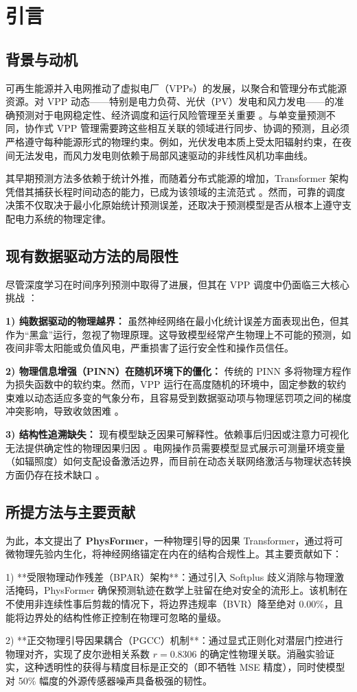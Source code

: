 \section{引言}

\subsection{背景与动机}
可再生能源并入电网推动了虚拟电厂（VPPs）的发展，以聚合和管理分布式能源资源。对 VPP 动态——特别是电力负荷、光伏（PV）发电和风力发电——的准确预测对于电网稳定性、经济调度和运行风险管理至关重要 \cite{Ma2025,Cao2023,Qiu2024,Moreno2020,Wu2024}。与单变量预测不同，协作式 VPP 管理需要跨这些相互关联的领域进行同步、协调的预测，且必须严格遵守每种能源形式的物理约束。例如，光伏发电本质上受太阳辐射约束，在夜间无法发电，而风力发电则依赖于局部风速驱动的非线性风机功率曲线。

其早期预测方法多依赖于统计外推，而随着分布式能源的增加，Transformer 架构凭借其捕获长程时间动态的能力，已成为该领域的主流范式 \cite{Zhou2021informer,Wu2021autoformer,Nie2023patchtst,Zeng2023}。然而，可靠的调度决策不仅取决于最小化原始统计预测误差，还取决于预测模型是否从根本上遵守支配电力系统的物理定律。

\subsection{现有数据驱动方法的局限性}
尽管深度学习在时间序列预测中取得了进展，但其在 VPP 调度中仍面临三大核心挑战 \cite{Vle2025,Arabzadeh2025}：

\textbf{1) 纯数据驱动的物理越界：} 虽然神经网络在最小化统计误差方面表现出色，但其作为“黑盒”运行，忽视了物理原理。这导致模型经常产生物理上不可能的预测，如夜间非零太阳能或负值风电，严重损害了运行安全性和操作员信任。

\textbf{2) 物理信息增强（PINN）在随机环境下的僵化：} 传统的 PINN \cite{Raissi2019} 多将物理方程作为损失函数中的软约束。然而，VPP 运行在高度随机的环境中，固定参数的软约束难以动态适应多变的气象分布，且容易受到数据驱动项与物理惩罚项之间的梯度冲突影响，导致收敛困难 \cite{Li2026,Asinyo2025}。

\textbf{3) 结构性追溯缺失：} 现有模型缺乏因果可解释性。依赖事后归因或注意力可视化无法提供确定性的物理因果归因 \cite{Lovo2025}。电网操作员需要模型显式展示可测量环境变量（如辐照度）如何支配设备激活边界，而目前在动态关联网络激活与物理状态转换方面仍存在技术缺口 \cite{Song2025,Chen2024}。

\subsection{所提方法与主要贡献}
为此，本文提出了 \textbf{PhysFormer}，一种物理引导的因果 Transformer，通过将可微物理先验内生化，将神经网络锚定在内在的结构合规性上。其主要贡献如下：

1) **受限物理动作残差（BPAR）架构**：通过引入 Softplus 歧义消除与物理激活掩码，PhysFormer 确保预测轨迹在数学上驻留在绝对安全的流形上。该机制在不使用非连续性事后剪裁的情况下，将边界违规率（BVR）降至绝对 0.00\%，且能将边界处的结构性修正控制在物理可忽略的量级。

2) **正交物理引导因果耦合（PGCC）机制**：通过显式正则化对潜层门控进行物理对齐，实现了皮尔逊相关系数 $r=0.8306$ 的确定性物理关联。消融实验证实，这种透明性的获得与精度目标是正交的（即不牺牲 MSE 精度），同时使模型对 50\% 幅度的外源传感器噪声具备极强的韧性。


